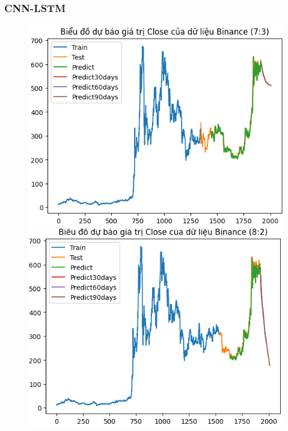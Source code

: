 \documentclass[conference]{IEEEtran}
\begin{document}
\subsubsection{CNN-LSTM}
\begin{figure}[H]
    \centering
    \begin{minipage}{0.15\textwidth}
    \centering
    \includegraphics[width=1\textwidth]{Figure/RNN_BNB73.png}
    \end{minipage}
    \hfill
    \begin{minipage}{0.15\textwidth}
    \centering
    \includegraphics[width=1\textwidth]{Figure/RNN_BNB82.png}
    \end{minipage}

\end{figure}
\end{document}
